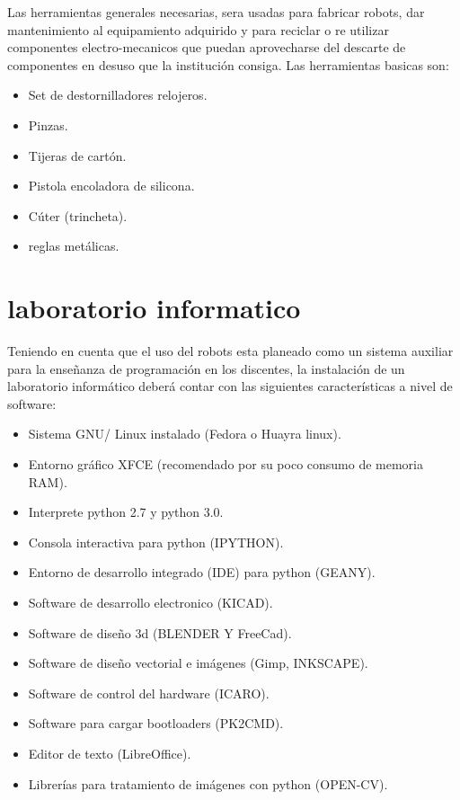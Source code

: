 Las herramientas generales necesarias, sera usadas para fabricar robots, dar mantenimiento al equipamiento adquirido y para reciclar o re utilizar componentes electro-mecanicos que puedan aprovecharse del descarte de componentes en desuso que la institución consiga. Las herramientas basicas son:

  \begin{itemize}
    \item Set de destornilladores relojeros.
    \item Pinzas.
    \item Tijeras de cartón.
    \item Pistola encoladora de silicona.
    \item Cúter (trincheta).
    \item reglas metálicas.
  \end{itemize}
  
\section{laboratorio informatico}

Teniendo en cuenta que el uso del robots esta planeado como un sistema auxiliar para la enseñanza de programación en los discentes, la instalación de un laboratorio informático deberá contar con las siguientes características a nivel de software:

\begin{itemize}
  \item Sistema GNU/ Linux instalado (Fedora o Huayra linux).
  \item Entorno gráfico XFCE (recomendado por su poco consumo de memoria RAM).
  \item Interprete python 2.7 y python 3.0.
  \item Consola interactiva para python (IPYTHON).
  \item Entorno de desarrollo integrado (IDE) para python (GEANY).
  \item Software de desarrollo electronico (KICAD).
  \item Software de diseño 3d (BLENDER Y FreeCad).
  \item Software de diseño vectorial e imágenes (Gimp, INKSCAPE).
  \item Software de control del hardware (ICARO).
  \item Software para cargar bootloaders (PK2CMD).
  \item Editor de texto (LibreOffice).
  \item Librerías para tratamiento de imágenes con python (OPEN-CV).
\end{itemize}

